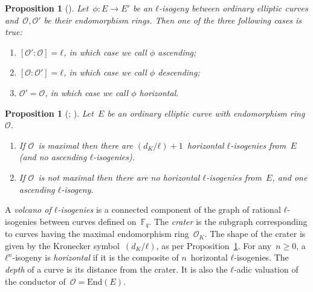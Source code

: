 \documentclass{lms}
\newtheorem{prop}[thm]{Proposition}
\begin{document}
\begin{prop}[{\cite[Proposition~21]{Kohel}}] \label{prop:isogeny-asc-desc}
Let~$ϕ: E → E'$ be an $ℓ$-isogeny between ordinary elliptic curves
and~$\mathcal O, \mathcal O'$ be their endomorphism rings.
Then one of the three following cases is true:
\begin{enumerate}
\item $[\mathcal O':\mathcal O] = ℓ$,
in which case we call $ϕ$ \emph{ascending};
\item $[\mathcal O:\mathcal O'] = ℓ$,
in which case we call $ϕ$ \emph{descending};
\item $\mathcal O' = \mathcal O$,
in which case we call $ϕ$ \emph{horizontal}.
\end{enumerate}
\end{prop}
\begin{prop}[{\cite[Proposition~23]{Kohel}; \cite[Lemma~6]{sutherland2013isogeny}}] \label{prop:isogeny-count}
Let~$E$ be an ordinary elliptic curve with endomorphism ring~$\mathcal O$.
\begin{enumerate}
\item If $\mathcal O$~is maximal then
there are $(d_K/ℓ)+1$~horizontal $ℓ$-isogenies from~$E$
(and no ascending $ℓ$-isogenies).
\item If $\mathcal O$~is not maximal then
there are no horizontal $ℓ$-isogenies from~$E$,
and one ascending $ℓ$-isogeny.
\end{enumerate}
\end{prop}

A \emph{volcano of $ℓ$-isogenies} is a connected component
of the graph of rational $ℓ$-isogenies between curves defined on~$\mathbb F_q$.
The \emph{crater} is the subgraph corresponding to curves
having the maximal endomorphism ring~$\mathcal O_K$.
The shape of the crater is given by the Kronecker symbol~$(d_K/ℓ)$,
as per Proposition~\ref{prop:isogeny-count}.
For any~$n ≥ 0$, a $ℓ^n$-isogeny is \emph{horizontal}
if it is the composite of $n$~horizontal $ℓ$-isogenies.
The \emph{depth} of a curve is its distance from the crater.
It is also the $ℓ$-adic valuation of the conductor
of~$\mathcal O = \mathrm{End}(E)$.
\end{document}
